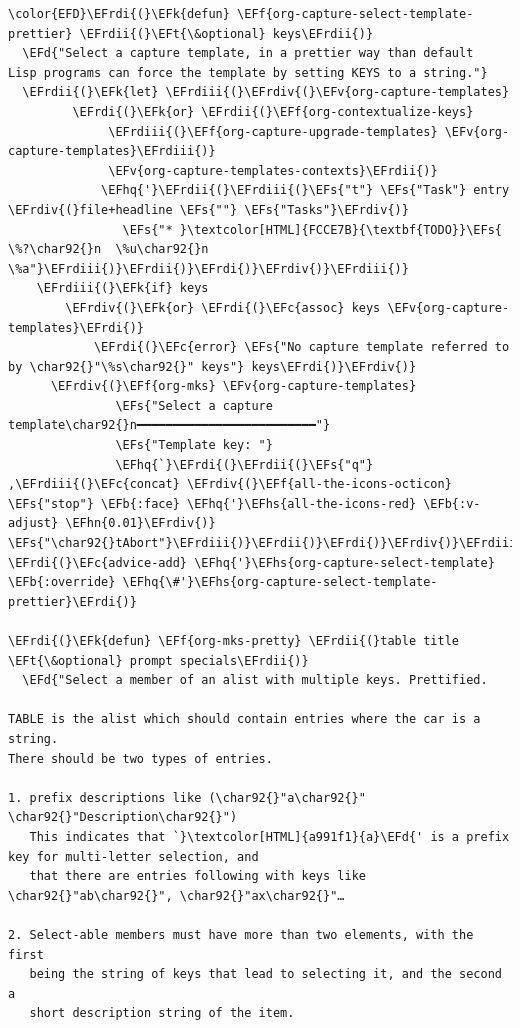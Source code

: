 \documentclass{scrartcl}
\newcommand{\EFk}[1]{\textcolor{EFk}{#1}} %
\newcommand{\EFd}[1]{\textcolor{EFd}{#1}} %
\newcommand{\EFt}[1]{\textcolor{EFt}{#1}} %
\newcommand{\EFs}[1]{\textcolor{EFs}{#1}} %
\newcommand{\EFb}[1]{\textcolor{EFb}{#1}} %
\newcommand{\EFc}[1]{\textcolor{EFc}{#1}} %
\newcommand{\EFv}[1]{\textcolor{EFv}{#1}} %
\newcommand{\EFf}[1]{\textcolor{EFf}{#1}} %
\newcommand{\EFhn}[1]{#1} %
\newcommand{\EFhq}[1]{#1} %
\newcommand{\EFhs}[1]{#1} %
\newcommand{\EFrdi}[1]{#1} %
\newcommand{\EFrdii}[1]{#1} %
\newcommand{\EFrdiii}[1]{#1} %
\newcommand{\EFrdiv}[1]{#1} %
\begin{document}
\begin{Code}
\begin{Verbatim}[]
\color{EFD}\EFrdi{(}\EFk{defun} \EFf{org-capture-select-template-prettier} \EFrdii{(}\EFt{\&optional} keys\EFrdii{)}
  \EFd{"Select a capture template, in a prettier way than default
Lisp programs can force the template by setting KEYS to a string."}
  \EFrdii{(}\EFk{let} \EFrdiii{(}\EFrdiv{(}\EFv{org-capture-templates}
         \EFrdi{(}\EFk{or} \EFrdii{(}\EFf{org-contextualize-keys}
              \EFrdiii{(}\EFf{org-capture-upgrade-templates} \EFv{org-capture-templates}\EFrdiii{)}
              \EFv{org-capture-templates-contexts}\EFrdii{)}
             \EFhq{'}\EFrdii{(}\EFrdiii{(}\EFs{"t"} \EFs{"Task"} entry \EFrdiv{(}file+headline \EFs{""} \EFs{"Tasks"}\EFrdiv{)}
                \EFs{"* }\textcolor[HTML]{FCCE7B}{\textbf{TODO}}\EFs{ \%?\char92{}n  \%u\char92{}n  \%a"}\EFrdiii{)}\EFrdii{)}\EFrdi{)}\EFrdiv{)}\EFrdiii{)}
    \EFrdiii{(}\EFk{if} keys
        \EFrdiv{(}\EFk{or} \EFrdi{(}\EFc{assoc} keys \EFv{org-capture-templates}\EFrdi{)}
            \EFrdi{(}\EFc{error} \EFs{"No capture template referred to by \char92{}"\%s\char92{}" keys"} keys\EFrdi{)}\EFrdiv{)}
      \EFrdiv{(}\EFf{org-mks} \EFv{org-capture-templates}
               \EFs{"Select a capture template\char92{}n━━━━━━━━━━━━━━━━━━━━━━━━━"}
               \EFs{"Template key: "}
               \EFhq{`}\EFrdi{(}\EFrdii{(}\EFs{"q"} ,\EFrdiii{(}\EFc{concat} \EFrdiv{(}\EFf{all-the-icons-octicon} \EFs{"stop"} \EFb{:face} \EFhq{'}\EFhs{all-the-icons-red} \EFb{:v-adjust} \EFhn{0.01}\EFrdiv{)} \EFs{"\char92{}tAbort"}\EFrdiii{)}\EFrdii{)}\EFrdi{)}\EFrdiv{)}\EFrdiii{)}\EFrdii{)}\EFrdi{)}
\EFrdi{(}\EFc{advice-add} \EFhq{'}\EFhs{org-capture-select-template} \EFb{:override} \EFhq{\#'}\EFhs{org-capture-select-template-prettier}\EFrdi{)}

\EFrdi{(}\EFk{defun} \EFf{org-mks-pretty} \EFrdii{(}table title \EFt{\&optional} prompt specials\EFrdii{)}
  \EFd{"Select a member of an alist with multiple keys. Prettified.

TABLE is the alist which should contain entries where the car is a string.
There should be two types of entries.

1. prefix descriptions like (\char92{}"a\char92{}" \char92{}"Description\char92{}")
   This indicates that `}\textcolor[HTML]{a991f1}{a}\EFd{' is a prefix key for multi-letter selection, and
   that there are entries following with keys like \char92{}"ab\char92{}", \char92{}"ax\char92{}"…

2. Select-able members must have more than two elements, with the first
   being the string of keys that lead to selecting it, and the second a
   short description string of the item.


\end{Verbatim}
\end{Code}
\end{document}
